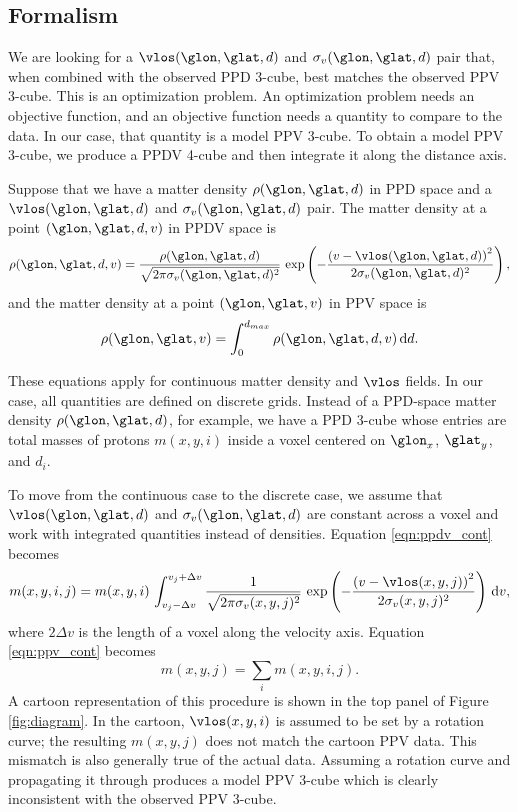 \subsection{Formalism}
\label{sec:KT-method}
We are looking for a $\vlos(\glon, \glat, d)$ and $\sigma_v(\glon, \glat, d)$ pair that, when combined with the observed PPD 3-cube, best matches the observed PPV 3-cube. 
This is an optimization problem. 
An optimization problem needs an objective function, and an objective function needs a quantity to compare to the data. 
In our case, that quantity is a model PPV 3-cube.
To obtain a model PPV 3-cube, we produce a PPDV 4-cube and then integrate it along the distance axis. 

Suppose that we have a matter density $\rho(\glon, \glat, d)$ in PPD space and a $\vlos(\glon, \glat, d)$ and $\sigma_v(\glon, \glat, d)$ pair. 
The matter density at a point $(\glon, \glat, d, v)$ in PPDV space is 
\begin{equation}
 \label{eqn:ppdv_cont}
  \rho(\glon, \glat, d, v) = \frac{\rho(\glon, \glat, d)}{\sqrt{2 \pi \sigma_v(\glon, \glat, d)^2}} 
   \, \exp\left(- \frac{\left( v - \vlos(\glon, \glat, d) \right)^2}{2 \sigma_v(\glon, \glat, d)^2} \right),
\end{equation}
and the matter density at a point $(\glon, \glat, v)$ in PPV space is
\begin{equation}
  \label{eqn:ppv_cont}
  \rho(\glon, \glat, v) = \int_0^{d_{max}} \rho(\glon, \glat, d, v) \, {\rm d}d.
\end{equation}

These equations apply for continuous matter density and $\vlos$ fields.
In our case, all quantities are defined on discrete grids. 
Instead of a PPD-space matter density $\rho(\glon, \glat, d)$, for example, we have a PPD 3-cube whose entries are total masses of protons $m(x, y, i)$ inside a voxel centered on $\glon_x$, $\glat_y$, and $d_i$.

To move from the continuous case to the discrete case, we assume that $\vlos(\glon, \glat, d)$ and $\sigma_v(\glon, \glat, d)$ are constant across a voxel and work with integrated quantities instead of densities. 
Equation \ref{eqn:ppdv_cont} becomes
\begin{equation}
  \label{eqn:ppdv_disc}
  m(x, y, i, j) = m(x, y, i) \, \int_{v_j - \Delta v}^{v_j + \Delta v} 
 \frac{1}{\sqrt{2 \pi \sigma_v(x, y, j)^2}} \,
    \exp\left(- \frac{\left( v - \vlos(x, y, j) \right)^2}{2 \sigma_v(x, y, j)^2} \right)\, {\rm d}v,
\end{equation}
where $2 \Delta v$ is the length of a voxel along the velocity axis.
Equation \ref{eqn:ppv_cont} becomes
\begin{equation}
  \label{eqn:ppv_disc}
  m(x, y, j) = \sum_{i} m(x, y, i, j).
\end{equation}
A cartoon representation of this procedure is shown in the top panel of Figure \ref{fig:diagram}.
In the cartoon, $\vlos(x, y, i)$ is assumed to be set by a rotation curve; the resulting $m(x, y, j)$ does not match the cartoon PPV data.
This mismatch is also generally true of the actual data.
Assuming a rotation curve and propagating it through produces a model PPV 3-cube which is clearly inconsistent with the observed PPV 3-cube. 

